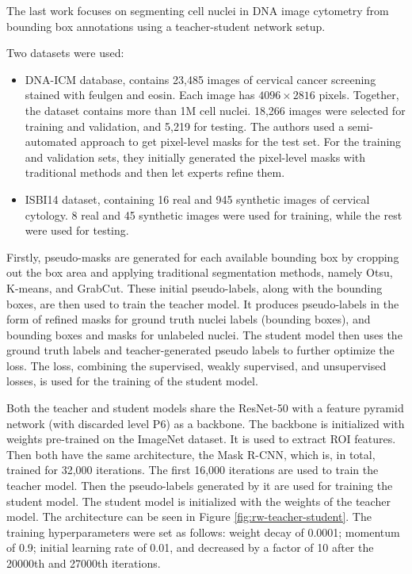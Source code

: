 The last work focuses on segmenting cell nuclei in DNA image cytometry from bounding box annotations using a teacher-student network setup.

Two datasets were used:

\begin{itemize}
    \item DNA-ICM database, contains 23,485 images of cervical cancer screening stained with feulgen and eosin. Each image has $4096\!\times\!2816$ pixels. Together, the dataset contains more than 1M cell nuclei. 18,266 images were selected for training and validation, and 5,219 for testing. The authors used a semi-automated approach to get pixel-level masks for the test set. For the training and validation sets, they initially generated the pixel-level masks with traditional methods and then let experts refine them.
    \item ISBI14 dataset, containing 16 real and 945 synthetic images of cervical cytology. 8 real and 45 synthetic images were used for training, while the rest were used for testing.
\end{itemize}

Firstly, pseudo-masks are generated for each available bounding box by cropping out the box area and applying traditional segmentation methods, namely Otsu, K-means, and GrabCut. These initial pseudo-labels, along with the bounding boxes, are then used to train the teacher model. It produces pseudo-labels in the form of refined masks for ground truth nuclei labels (bounding boxes), and bounding boxes and masks for unlabeled nuclei. The student model then uses the ground truth labels and teacher-generated pseudo labels to further optimize the loss. The loss, combining the supervised, weakly supervised, and unsupervised losses, is used for the training of the student model.

Both the teacher and student models share the ResNet-50 with a feature pyramid network (with discarded level P6) as a backbone. The backbone is initialized with weights pre-trained on the ImageNet dataset. It is used to extract ROI features. Then both have the same architecture, the Mask R-CNN, which is, in total, trained for 32,000 iterations. The first 16,000 iterations are used to train the teacher model. Then the pseudo-labels generated by it are used for training the student model. The student model is initialized with the weights of the teacher model. The architecture can be seen in Figure \ref{fig:rw-teacher-student}. The training hyperparameters were set as follows: weight decay of 0.0001; momentum of 0.9; initial learning rate of 0.01, and decreased by a factor of 10 after the 20000th and 27000th iterations.

